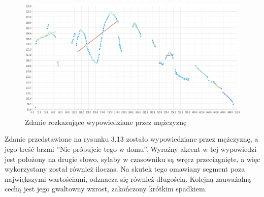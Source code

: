 \documentclass[a4paper,12 pt]{report}
\begin{document}
 \FloatBarrier
\begin{figure}[h]
\centering
\includegraphics[scale=0.85]{rozkaz_dom.pdf}
\caption{Zdanie rozkazujące wypowiedziane przez mężczyznę}
\end{figure}
\FloatBarrier
Zdanie przedstawione na rysunku 3.13 zostało wypowiedziane przez mężczyznę, a jego treść brzmi ''Nie próbujcie tego w domu''. Wyraźny akcent w tej wypowiedzi jest położony na drugie słowo, sylaby w czasowniku są wręcz przeciagnięte, a więc wykorzystany został również iloczas. Na skutek tego omawiany segment poza największymi wartościami, odznacza się również długością. Kolejną zauważalną cechą jest jego gwaltowny wzrost, zakończony krótkim spadkiem. 
\end{document}
